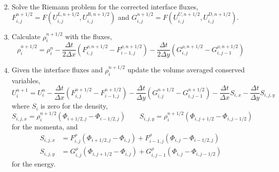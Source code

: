 \documentclass{article}
\begin{document}
\begin{enumerate}
\begin{align}
	\end{align}
	\item Solve the Riemann problem for the corrected interface fluxes, $F_{i,j}^{n+1/2} = F(U_{i,j}^{L,n+1/2}, U_{i,j}^{R,n+1/2})$ and $G_{i,j}^{n+1/2} = F(U_{i,j}^{U,n+1/2},U_{i,j}^{D,n+1/2})$. 
	\item Calculate $\rho_i^{n+1/2}$ with the fluxes,
	\begin{equation}
		\rho_i^{n+1/2} = \rho_i^n - \frac{\Delta t}{2 \Delta x} \left(F_{i,j}^{\rho,n+1/2} - F_{i-1,j}^{\rho,n+1/2} \right)  - \frac{\Delta t}{2 \Delta y} \left(G_{i,j}^{\rho,n+1/2} - G_{i,j-1}^{\rho,n+1/2} \right) 
	\end{equation}

	\item Given the interface fluxes and $\rho_i^{n+1/2}$ update the volume averaged conserved variables, 
	\begin{equation}
		U_i^{n+1} = U_i^n - \frac{\Delta t}{\Delta x} \left(F_{i,j}^{n+1/2} - F_{i-1,j}^{n+1/2} \right) - \frac{\Delta t}{\Delta y} \left(G_{i,j}^{n+1/2} - G_{i,j-1}^{n+1/2} \right) - \frac{\Delta t}{\Delta x} S_{i,x} - \frac{\Delta t}{\Delta y} S_{i,j,y}
	\end{equation}
	where $S_i$ is zero for the density, 
	\begin{equation}
		S_{i,j,x} = \rho_i^{n+1/2} \left( \Phi_{i+1/2,j}-\Phi_{i-1/2,j} \right) \qquad S_{i,j,y} = \rho_i^{n+1/2} \left( \Phi_{i,j+1/2}-\Phi_{i,j-1/2} \right)
	\end{equation}
	for the momenta, and
	\begin{align}
		S_{i,j,x} &= F_{i,j}^\rho \left(\Phi_{i+1/2,j}-\Phi_{i,j}\right) + F_{i-1,j}^\rho \left(\Phi_{i,j}-\Phi_{i-1/2,j}\right) \\
		S_{i,j,y} &= G_{i,j}^\rho \left(\Phi_{i,j+1/2}-\Phi_{i,j}\right) + G_{i,j-1}^\rho \left(\Phi_{i,j}-\Phi_{i,j-1/2}\right)
	\end{align}
	for the energy.

\end{enumerate}
\end{document}
